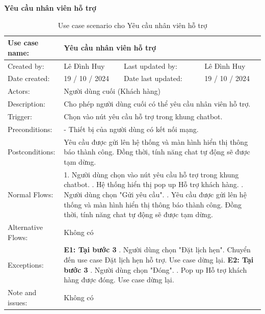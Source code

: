 \textbf{Yêu cầu nhân viên hỗ trợ}
\begin{table}[H]
    \centering
    \begin{tabular}{|l|l|l|l|} 
        \hline
        Use case name: & \multicolumn{3}{|l|}{Yêu cầu nhân viên hỗ trợ} \\
        \hline
        Created by: & Lê Đình Huy & Last updated by: & Lê Đình Huy \\
        \hline
        Date created: & 19 / 10 / 2024 & Date last updated: & 19 / 10 / 2024 \\
        \hline
        Actors: & \multicolumn{3}{|l|}{Người dùng cuối (Khách hàng)} \\
        \hline
        Description: & \multicolumn{3}{|p{12cm}|}{Cho phép người dùng cuối có thể yêu cầu nhân viên hỗ trợ.} \\ 
        \hline
        Trigger: & \multicolumn{3}{|p{12cm}|}{Chọn vào nút yêu cầu hỗ trợ trong khung chatbot.} \\
        \hline
        Preconditions: & \multicolumn{3}{|p{12cm}|}{- Thiết bị của người dùng có kết nối mạng.} \\
        \hline
        Postconditions: & \multicolumn{3}{|p{12cm}|}{Yêu cầu được gửi lên hệ thống và màn hình hiển thị thông báo thành công. Đồng thời, tính năng chat tự động sẽ được tạm dừng.} \\
        \hline
        Normal Flows: & \multicolumn{3}{|p{12cm}|}{1. Người dùng chọn vào nút yêu cầu hỗ trợ trong khung chatbot. \newline
        2. Hệ thống hiển thị pop up Hỗ trợ khách hàng. \newline
        3. Người dùng chọn "Gửi yêu cầu". \newline
        4. Yêu cầu được gửi lên hệ thống và màn hình hiển thị thông báo thành công. Đồng thời, tính năng chat tự động sẽ được tạm dừng.} \\
        \hline
        Alternative Flows: & \multicolumn{3}{|p{12cm}|}{Không có} \\
        \hline
        Exceptions: & \multicolumn{3}{|p{12cm}|}{\textbf{E1: Tại bước 3} \newline
        3.1. Người dùng chọn "Đặt lịch hẹn". \newline
        Chuyển đến use case Đặt lịch hẹn hỗ trợ. Use case dừng lại. \newline
        \textbf{E2: Tại bước 3} \newline
        3.1. Người dùng chọn "Đóng". \newline
        3.2. Pop up Hỗ trợ khách hàng được đóng. \newline
        Use case dừng lại.} \\
        \hline
        Note and issues: & \multicolumn{3}{|p{12cm}|}{Không có} \\
        \hline
    \end{tabular}
    \caption{Use case scenario cho Yêu cầu nhân viên hỗ trợ}
\end{table}



